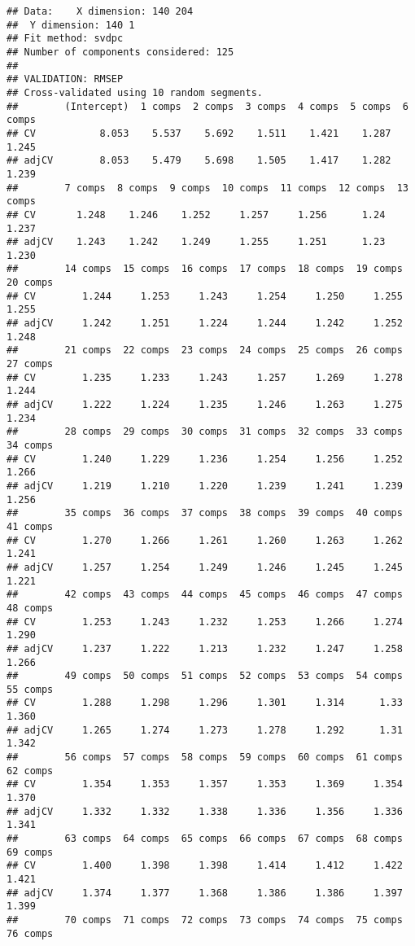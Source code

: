\documentclass[
]{article}
\begin{document}
\begin{verbatim}
## Data:    X dimension: 140 204 
##  Y dimension: 140 1
## Fit method: svdpc
## Number of components considered: 125
## 
## VALIDATION: RMSEP
## Cross-validated using 10 random segments.
##        (Intercept)  1 comps  2 comps  3 comps  4 comps  5 comps  6 comps
## CV           8.053    5.537    5.692    1.511    1.421    1.287    1.245
## adjCV        8.053    5.479    5.698    1.505    1.417    1.282    1.239
##        7 comps  8 comps  9 comps  10 comps  11 comps  12 comps  13 comps
## CV       1.248    1.246    1.252     1.257     1.256      1.24     1.237
## adjCV    1.243    1.242    1.249     1.255     1.251      1.23     1.230
##        14 comps  15 comps  16 comps  17 comps  18 comps  19 comps  20 comps
## CV        1.244     1.253     1.243     1.254     1.250     1.255     1.255
## adjCV     1.242     1.251     1.224     1.244     1.242     1.252     1.248
##        21 comps  22 comps  23 comps  24 comps  25 comps  26 comps  27 comps
## CV        1.235     1.233     1.243     1.257     1.269     1.278     1.244
## adjCV     1.222     1.224     1.235     1.246     1.263     1.275     1.234
##        28 comps  29 comps  30 comps  31 comps  32 comps  33 comps  34 comps
## CV        1.240     1.229     1.236     1.254     1.256     1.252     1.266
## adjCV     1.219     1.210     1.220     1.239     1.241     1.239     1.256
##        35 comps  36 comps  37 comps  38 comps  39 comps  40 comps  41 comps
## CV        1.270     1.266     1.261     1.260     1.263     1.262     1.241
## adjCV     1.257     1.254     1.249     1.246     1.245     1.245     1.221
##        42 comps  43 comps  44 comps  45 comps  46 comps  47 comps  48 comps
## CV        1.253     1.243     1.232     1.253     1.266     1.274     1.290
## adjCV     1.237     1.222     1.213     1.232     1.247     1.258     1.266
##        49 comps  50 comps  51 comps  52 comps  53 comps  54 comps  55 comps
## CV        1.288     1.298     1.296     1.301     1.314      1.33     1.360
## adjCV     1.265     1.274     1.273     1.278     1.292      1.31     1.342
##        56 comps  57 comps  58 comps  59 comps  60 comps  61 comps  62 comps
## CV        1.354     1.353     1.357     1.353     1.369     1.354     1.370
## adjCV     1.332     1.332     1.338     1.336     1.356     1.336     1.341
##        63 comps  64 comps  65 comps  66 comps  67 comps  68 comps  69 comps
## CV        1.400     1.398     1.398     1.414     1.412     1.422     1.421
## adjCV     1.374     1.377     1.368     1.386     1.386     1.397     1.399
##        70 comps  71 comps  72 comps  73 comps  74 comps  75 comps  76 comps

\end{verbatim}
\end{document}
